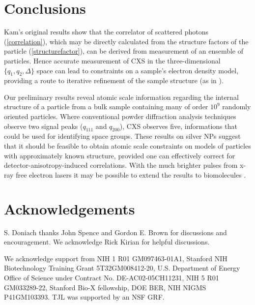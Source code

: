 \documentclass [11pt,fleqn]{article}
\begin{document}
\section{Conclusions}

Kam's original results \cite{Kam:1977wc} show that the correlator of scattered photons (\ref{correlation}), which may be directly calculated from the structure factors of the particle (\ref{structurefactor}), can be derived from measurement of an ensemble of particles. Hence accurate measurement of CXS in the three-dimensional $\{q_1,q_2,\Delta\}$ space can lead to constraints on a sample's electron density model, providing a route to iterative refinement of the sample structure (as in \cite{Schroder:2010cm}).

Our preliminary results reveal atomic scale information regarding the internal structure of a particle from a bulk sample containing many of order $10^9$ randomly oriented particles. Where conventional powder diffraction analysis techniques observe two signal peaks ($q_{111}$ and $q_{200}$), CXS observes five, informations that could be used for identifying space groups. These results on silver NPs suggest that it should be feasible to obtain atomic scale constraints on models of particles with approximately known structure, provided one can effectively correct for detector-anisotropy-induced correlations. With the much brighter pulses from x-ray free electron lasers it may be possible to extend the results to biomolecules \cite{Neutze:2000ih, Spence:2012eo}. 

\section{Acknowledgements}
S. Doniach thanks John Spence and Gordon E. Brown for discussions and encouragement. We acknowledge Rick Kirian for helpful discussions.

We acknowledge support from NIH 1 R01 GM097463-01A1, Stanford NIH Biotechnology Training Grant 5T32GM008412-20, U.S. Department of Energy Office of Science under Contract No. DE-AC02-05CH11231, NIH 5 R01 GM033289-22, Stanford Bio-X fellowship, DOE BER, NIH NIGMS P41GM103393. TJL was supported by an NSF GRF.
\end{document}
